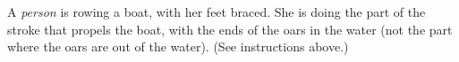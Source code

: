  A \emph{person} is rowing a boat, with her feet braced.
She is doing the part of the stroke that propels the boat,
with the ends of the oars in the water (not the part where
the oars are out of the water).
(See instructions above.)
